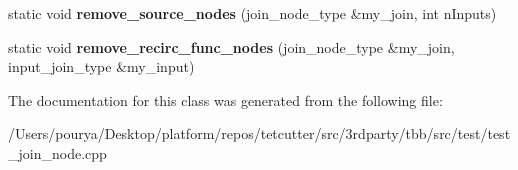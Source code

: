 \begin{DoxyCompactItemize}
\item 
\hypertarget{classsource__node__helper_3_011_00_01JNT_01_4_a179f8f33c3fe97c1a7a583c1e3f884bb}{}static void {\bfseries remove\+\_\+source\+\_\+nodes} (join\+\_\+node\+\_\+type \&my\+\_\+join, int n\+Inputs)\label{classsource__node__helper_3_011_00_01JNT_01_4_a179f8f33c3fe97c1a7a583c1e3f884bb}

\item 
\hypertarget{classsource__node__helper_3_011_00_01JNT_01_4_a0466c55d8ab9a3d2b7fe19730990a619}{}static void {\bfseries remove\+\_\+recirc\+\_\+func\+\_\+nodes} (join\+\_\+node\+\_\+type \&my\+\_\+join, input\+\_\+join\+\_\+type \&my\+\_\+input)\label{classsource__node__helper_3_011_00_01JNT_01_4_a0466c55d8ab9a3d2b7fe19730990a619}

\end{DoxyCompactItemize}


The documentation for this class was generated from the following file\+:\begin{DoxyCompactItemize}
\item 
/\+Users/pourya/\+Desktop/platform/repos/tetcutter/src/3rdparty/tbb/src/test/test\+\_\+join\+\_\+node.\+cpp\end{DoxyCompactItemize}
